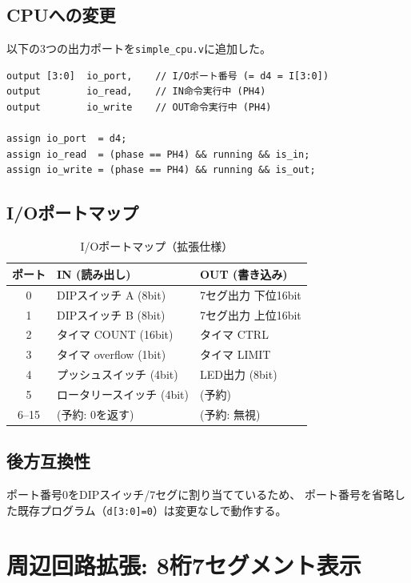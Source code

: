 \documentclass[a4paper,11pt]{ltjsarticle}
\begin{document}
\subsection{CPUへの変更}

以下の3つの出力ポートを\texttt{simple\_cpu.v}に追加した。

\begin{lstlisting}[caption={CPUに追加したI/O制御信号}]
output [3:0]  io_port,    // I/Oポート番号 (= d4 = I[3:0])
output        io_read,    // IN命令実行中 (PH4)
output        io_write    // OUT命令実行中 (PH4)

assign io_port  = d4;
assign io_read  = (phase == PH4) && running && is_in;
assign io_write = (phase == PH4) && running && is_out;
\end{lstlisting}

\subsection{I/Oポートマップ}

\begin{table}[h]
\centering
\caption{I/Oポートマップ（拡張仕様）}
\begin{tabular}{cll}
\toprule
ポート & IN (読み出し) & OUT (書き込み) \\
\midrule
0  & DIPスイッチ A (8bit)   & 7セグ出力 下位16bit \\
1  & DIPスイッチ B (8bit)   & 7セグ出力 上位16bit \\
2  & タイマ COUNT (16bit)   & タイマ CTRL \\
3  & タイマ overflow (1bit) & タイマ LIMIT \\
4  & プッシュスイッチ (4bit)& LED出力 (8bit) \\
5  & ロータリースイッチ (4bit) & (予約) \\
6--15 & (予約: 0を返す)    & (予約: 無視) \\
\bottomrule
\end{tabular}
\end{table}

\subsection{後方互換性}

ポート番号0をDIPスイッチ/7セグに割り当てているため、
ポート番号を省略した既存プログラム（\texttt{d[3:0]=0}）は変更なしで動作する。


\section{周辺回路拡張: 8桁7セグメント表示}
\end{document}
